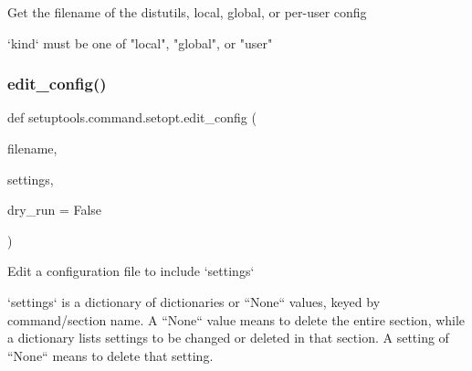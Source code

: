 \begin{DoxyVerb}Get the filename of the distutils, local, global, or per-user config

`kind` must be one of "local", "global", or "user"
\end{DoxyVerb}
 \mbox{\label{namespacesetuptools_1_1command_1_1setopt_aea3f5581fe84f5821452ac30e78dd66a}} 
\subsubsection{\texorpdfstring{edit\+\_\+config()}{edit\_config()}}
{\footnotesize\ttfamily def setuptools.\+command.\+setopt.\+edit\+\_\+config (\begin{DoxyParamCaption}\item[{}]{filename,  }\item[{}]{settings,  }\item[{}]{dry\+\_\+run = {\ttfamily False} }\end{DoxyParamCaption})}

\begin{DoxyVerb}Edit a configuration file to include `settings`

`settings` is a dictionary of dictionaries or ``None`` values, keyed by
command/section name.  A ``None`` value means to delete the entire section,
while a dictionary lists settings to be changed or deleted in that section.
A setting of ``None`` means to delete that setting.
\end{DoxyVerb}
 